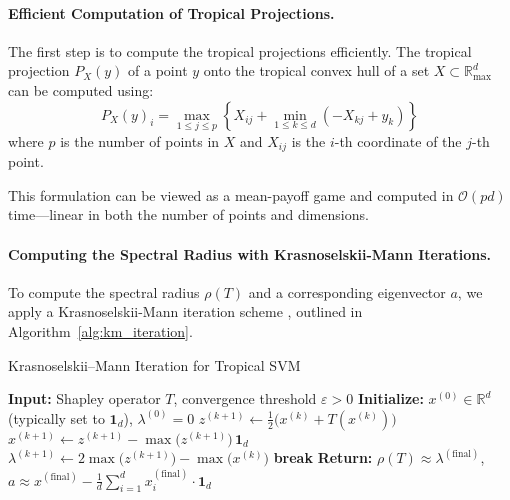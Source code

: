 \documentclass{article}
\newcommand{\R}{\mathbb{R}}
\newcommand{\Rmax}{\mathbb{R}_{\max}}
\begin{document}
\paragraph{Efficient Computation of Tropical Projections.}
\label{subsec:computing_projections}
The first step is to compute the tropical projections efficiently. The tropical projection $P_X(y)$ of a point $y$ onto the tropical convex hull of a set $X \subset \Rmax^d$ can be computed using:
\[
P_X(y)_i = \max_{1 \leq j \leq p} \left\{X_{ij} + \min_{1 \leq k \leq d} \left(-X_{kj} + y_k\right)\right\}
\]
where $p$ is the number of points in $X$ and $X_{ij}$ is the $i$-th coordinate of the $j$-th point.

This formulation can be viewed as a mean-payoff game \cite{akian2020} and computed in $\mathcal{O}(pd)$ time—linear in both the number of points and dimensions.

\paragraph{Computing the Spectral Radius with Krasnoselskii-Mann Iterations.}
\label{subsec:spectral_computation}
To compute the spectral radius $\rho(T)$ and a corresponding eigenvector $a$, we apply a Krasnoselskii-Mann iteration scheme \cite{nussbaum1986, gaubert2004}, outlined in Algorithm~\ref{alg:km_iteration}.

\begin{algorithm}
\caption{Krasnoselskii--Mann Iteration for Tropical SVM}\label{alg:km_iteration}
\begin{algorithmic}[1]
\STATE \textbf{Input:} Shapley operator $T$, convergence threshold $\varepsilon > 0$
\STATE \textbf{Initialize:} $x^{(0)} \in \R^d$ (typically set to $\mathbf{1}_d$), $\lambda^{(0)} = 0$
  \STATE $z^{(k+1)} \leftarrow \frac{1}{2}\bigl(x^{(k)} + T(x^{(k)})\bigr)$ 
  \STATE $x^{(k+1)} \leftarrow z^{(k+1)} - \max\bigl(z^{(k+1)}\bigr)\,\mathbf{1}_d$ 
  \STATE $\lambda^{(k+1)} \leftarrow 2\max\bigl(z^{(k+1)}\bigr) - \max\bigl(x^{(k)}\bigr)$ 
    \STATE \textbf{break}
  \ENDIF
\ENDFOR
\STATE \textbf{Return:} $\rho(T) \approx \lambda^{(\text{final})}$, $a \approx x^{(\text{final})} - \frac{1}{d}\sum_{i=1}^d x_i^{(\text{final})} \cdot \mathbf{1}_d$
\end{algorithmic}
\end{algorithm}
\end{document}
